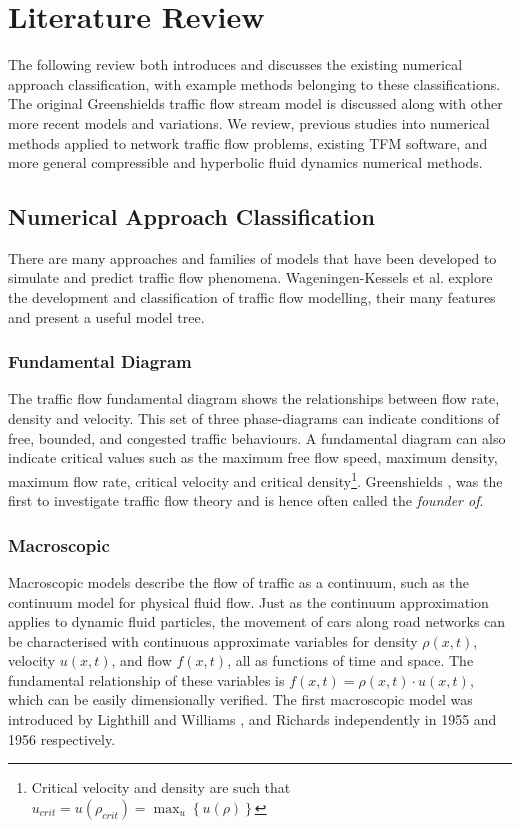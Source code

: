 \chapter{Literature Review}
\label{ch:lit}
\graphicspath{{image_directory/literature/}}

	The following review both introduces and discusses the existing numerical approach classification, with example methods belonging to these classifications. The original Greenshields traffic flow stream model is discussed along with other more recent models and variations. We review, previous studies into numerical methods applied to network traffic flow problems, existing TFM software, and more general compressible and hyperbolic fluid dynamics numerical methods. 

\section{Numerical Approach Classification}

	There are many approaches and families of models that have been developed to simulate and predict traffic flow phenomena. Wageningen-Kessels et al. \cite{Kessels15} explore the development and classification of traffic flow modelling, their many features and present a useful model tree. 
	
\subsection{Fundamental Diagram}

	The traffic flow fundamental diagram shows the relationships between flow rate, density and velocity. This set of three phase-diagrams can indicate conditions of free, bounded, and congested traffic behaviours. A fundamental diagram can also indicate critical values such as the maximum free flow speed, maximum density, maximum flow rate, critical velocity and critical density\footnote{Critical velocity and density are such that $u_{crit}=u(\rho_{crit})=\max_{u}\left\{u(\rho)\right\}$}. Greenshields \cite{Greenshields35},\cite{Kuhne11} was the first to investigate traffic flow theory and is hence often called the \emph{founder of}.

\subsection{Macroscopic}

	Macroscopic models describe the flow of traffic as a continuum, such as the continuum model for physical fluid flow. Just as the continuum approximation applies to dynamic fluid particles, the movement of cars along road networks can be characterised with continuous approximate variables for density $\rho(x,t)$, velocity $u(x,t)$, and flow $f(x,t)$, all as functions of time and space. The fundamental relationship of these variables is $f(x,t)=\rho(x,t)\cdot u(x,t)$, which can be easily dimensionally verified. The first macroscopic model was introduced by Lighthill and Williams \cite{Lighthill55}, and Richards \cite{Richards56} independently in 1955 and 1956 respectively. 

